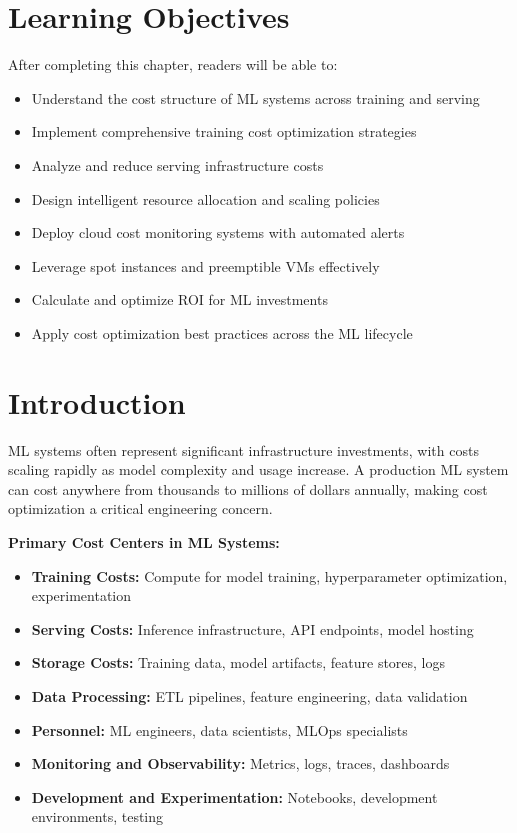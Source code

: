 \section{Learning Objectives}

After completing this chapter, readers will be able to:
\begin{itemize}
    \item Understand the cost structure of ML systems across training and serving
    \item Implement comprehensive training cost optimization strategies
    \item Analyze and reduce serving infrastructure costs
    \item Design intelligent resource allocation and scaling policies
    \item Deploy cloud cost monitoring systems with automated alerts
    \item Leverage spot instances and preemptible VMs effectively
    \item Calculate and optimize ROI for ML investments
    \item Apply cost optimization best practices across the ML lifecycle
\end{itemize}

\section{Introduction}

ML systems often represent significant infrastructure investments, with costs scaling rapidly as model complexity and usage increase. A production ML system can cost anywhere from thousands to millions of dollars annually, making cost optimization a critical engineering concern.

\textbf{Primary Cost Centers in ML Systems:}

\begin{itemize}
    \item \textbf{Training Costs:} Compute for model training, hyperparameter optimization, experimentation
    \item \textbf{Serving Costs:} Inference infrastructure, API endpoints, model hosting
    \item \textbf{Storage Costs:} Training data, model artifacts, feature stores, logs
    \item \textbf{Data Processing:} ETL pipelines, feature engineering, data validation
    \item \textbf{Personnel:} ML engineers, data scientists, MLOps specialists
    \item \textbf{Monitoring and Observability:} Metrics, logs, traces, dashboards
    \item \textbf{Development and Experimentation:} Notebooks, development environments, testing
\end{itemize}

